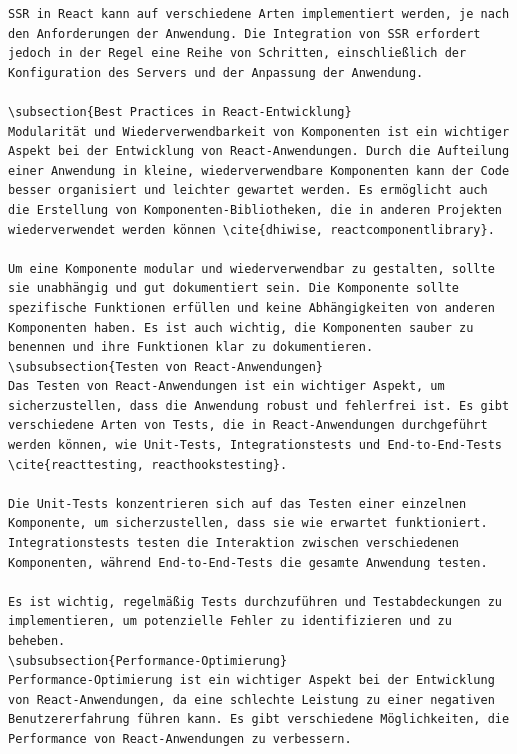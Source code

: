 \begin{lstlisting}
SSR in React kann auf verschiedene Arten implementiert werden, je nach den Anforderungen der Anwendung. Die Integration von SSR erfordert jedoch in der Regel eine Reihe von Schritten, einschließlich der Konfiguration des Servers und der Anpassung der Anwendung.

\subsection{Best Practices in React-Entwicklung}
Modularität und Wiederverwendbarkeit von Komponenten ist ein wichtiger Aspekt bei der Entwicklung von React-Anwendungen. Durch die Aufteilung einer Anwendung in kleine, wiederverwendbare Komponenten kann der Code besser organisiert und leichter gewartet werden. Es ermöglicht auch die Erstellung von Komponenten-Bibliotheken, die in anderen Projekten wiederverwendet werden können \cite{dhiwise, reactcomponentlibrary}.

Um eine Komponente modular und wiederverwendbar zu gestalten, sollte sie unabhängig und gut dokumentiert sein. Die Komponente sollte spezifische Funktionen erfüllen und keine Abhängigkeiten von anderen Komponenten haben. Es ist auch wichtig, die Komponenten sauber zu benennen und ihre Funktionen klar zu dokumentieren.
\subsubsection{Testen von React-Anwendungen}
Das Testen von React-Anwendungen ist ein wichtiger Aspekt, um sicherzustellen, dass die Anwendung robust und fehlerfrei ist. Es gibt verschiedene Arten von Tests, die in React-Anwendungen durchgeführt werden können, wie Unit-Tests, Integrationstests und End-to-End-Tests \cite{reacttesting, reacthookstesting}.

Die Unit-Tests konzentrieren sich auf das Testen einer einzelnen Komponente, um sicherzustellen, dass sie wie erwartet funktioniert. Integrationstests testen die Interaktion zwischen verschiedenen Komponenten, während End-to-End-Tests die gesamte Anwendung testen.

Es ist wichtig, regelmäßig Tests durchzuführen und Testabdeckungen zu implementieren, um potenzielle Fehler zu identifizieren und zu beheben.
\subsubsection{Performance-Optimierung}
Performance-Optimierung ist ein wichtiger Aspekt bei der Entwicklung von React-Anwendungen, da eine schlechte Leistung zu einer negativen Benutzererfahrung führen kann. Es gibt verschiedene Möglichkeiten, die Performance von React-Anwendungen zu verbessern.


\end{lstlisting}
